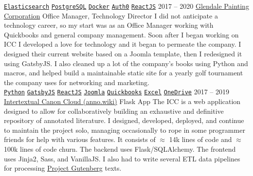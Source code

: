 \documentclass[9pt]{developercv} %
\begin{document}
\begin{entrylist}
{        \texttt{{\href{https://www.elastic.co/}{Elasticsearch}}}\slashsep
        \texttt{{\href{https://www.postgresql.org/}{PostgreSQL}}}\slashsep
        \texttt{{\href{https://www.docker.com/}{Docker}}}\slashsep
        \texttt{{\href{https://auth0.com/}{Auth0}}}\slashsep
        \texttt{{\href{https://reactjs.org/}{ReactJS}}}
        }
    \entry
        {2017 -- 2020}
        {{\href{https://glendalepainting.com/}{Glendale Painting Corporation}}}
        {Office Manager, Technology Director}
        {
            I did not anticipate a technology career, so my start was as an
            Office Manager working with Quickbooks and general company
            management. Soon after I began working on ICC I developed a love for
            technology and it began to permeate the company. I designed their
            current website based on a Joomla template, then I redesigned it
            using GatsbyJS. I also cleaned up a lot of the company's books using
            Python and macros, and helped build a maintainable static site
            for a yearly golf tournament the company uses for networking and
            marketing.
            \\
            \texttt{{\href{https://www.python.org/}{Python}}}\slashsep
            \texttt{{\href{https://www.gatsbyjs.org/}{GatsbyJS}}}\slashsep
            \texttt{{\href{https://reactjs.org/}{ReactJS}}}
            \texttt{{\href{https://www.joomla.org/}{Joomla}}}\slashsep
            \texttt{{\href{https://quickbooks.intuit.com/}{Quickbooks}}}\slashsep
            \texttt{{\href{https://www.microsoft.com/en-us/microsoft-365/excel}{Excel}}}\slashsep
            \texttt{{\href{https://www.microsoft.com/en-us/microsoft-365/onedrive/online-cloud-storage}{OneDrive}}}\slashsep
        }
    \entry
        {2017 -- 2019}
        {{\href{https://github.com/Anno-Wiki/icc}{Intertextual Canon Cloud (anno.wiki)}}}
        {Flask App}
        {
            The ICC is a web application designed to allow for collaboratively
            building an exhaustive and definitive repository of annotated
            literature. I designed, developed, deployed, and continue to
            maintain the project solo, managing occasionally to rope in some
            programmer friends for help with various features. It consists of
            $\approx$ 14k lines of code and $\approx$ 100k lines of code churn.
            The backend uses Flask/SQLAlchemy. The frontend uses Jinja2, Sass,
            and VanillaJS. I also had to write several ETL data pipelines for
            processing {\href{https://gutenberg.org}{Project Gutenberg}} texts.
}
\end{entrylist}
\end{document}
